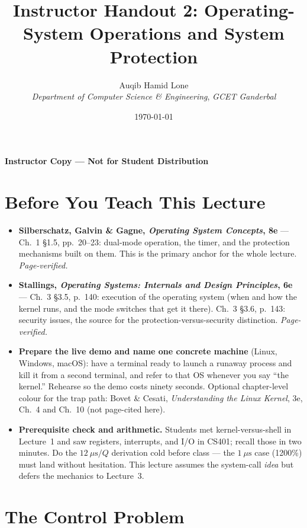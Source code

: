 \documentclass[11pt]{article}
\title{Instructor Handout 2: Operating-System Operations and System Protection}
\author{Auqib Hamid Lone\\[0.3em]
  \emph{Department of Computer Science \& Engineering}, \emph{GCET Ganderbal}}
\date{\today}
\begin{document}
\maketitle
{\centering\large\color{negative}\textbf{Instructor Copy --- Not for Student Distribution}\par}
\vspace{0.2cm}

\section{Before You Teach This Lecture}

\begin{itemize}
  \item \textbf{Silberschatz, Galvin \& Gagne, \textit{Operating System Concepts}, 8e} --- Ch.~1 §1.5, pp.~20--23: dual-mode operation, the timer, and the protection mechanisms built on them. This is the primary anchor for the whole lecture. \emph{Page-verified.}
  \item \textbf{Stallings, \textit{Operating Systems: Internals and Design Principles}, 6e} --- Ch.~3 §3.5, p.~140: execution of the operating system (when and how the kernel runs, and the mode switches that get it there). Ch.~3 §3.6, p.~143: security issues, the source for the protection-versus-security distinction. \emph{Page-verified.}
  \item \textbf{Prepare the live demo and name one concrete machine} (Linux, Windows, macOS): have a terminal ready to launch a runaway process and kill it from a second terminal, and refer to that OS whenever you say ``the kernel.'' Rehearse so the demo costs ninety seconds. Optional chapter-level colour for the trap path: Bovet \& Cesati, \textit{Understanding the Linux Kernel}, 3e, Ch.~4 and Ch.~10 (not page-cited here).
  \item \textbf{Prerequisite check and arithmetic.} Students met kernel-versus-shell in Lecture~1 and saw registers, interrupts, and I/O in CS401; recall those in two minutes. Do the $12\ \mu\text{s}/Q$ derivation cold before class --- the $1\ \mu\text{s}$ case (1200\%) must land without hesitation. This lecture assumes the system-call \emph{idea} but defers the mechanics to Lecture~3.
\end{itemize}

\section{The Control Problem}
\end{document}
